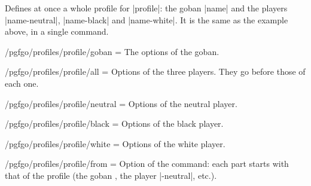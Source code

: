 \begin{command}{\pgfgodefineprofile{}}
	Defines at once a whole profile for |profile|: the goban |name| and the players |name-neutral|, |name-black| and |name-white|. It is the same as the example above, in a single command.

	\begin{codeexample}[width=3cm]


		\begin{goban}[partial = A1:C3]
		\end{goban}
	\end{codeexample}

	\begin{key}{/pgfgo/profiles/profile/goban = }
		The options of the goban.
	\end{key}

	\begin{key}{/pgfgo/profiles/profile/all = }
		Options of the three players. They go before those of each one.
	\end{key}

	\begin{key}{/pgfgo/profiles/profile/neutral = }
		Options of the neutral player.
	\end{key}

	\begin{key}{/pgfgo/profiles/profile/black = }
		Options of the black player.
	\end{key}

	\begin{key}{/pgfgo/profiles/profile/white = }
		Options of the white player.
	\end{key}

	\begin{key}{/pgfgo/profiles/profile/from = }
		Option of the command: each part starts with that of the profile  (the goban , the player |-neutral|, etc.).
	\end{key}
\end{command}
